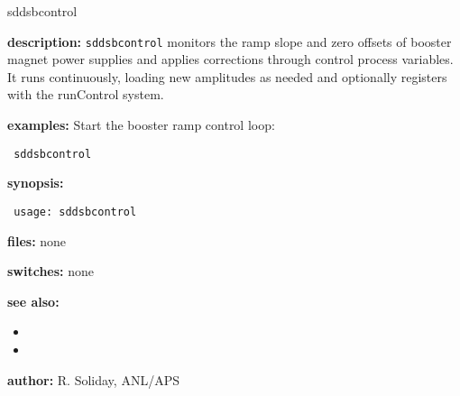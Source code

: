 %
\begin{sddsprog}{sddsbcontrol}
\item \textbf{description:}
\verb+sddsbcontrol+ monitors the ramp slope and zero offsets of booster magnet power supplies and applies corrections through control process variables. It runs continuously, loading new amplitudes as needed and optionally registers with the runControl system.

\item \textbf{examples:}
Start the booster ramp control loop:
\begin{flushleft}{\tt
sddsbcontrol\\
}\end{flushleft}

\item \textbf{synopsis:}
\begin{flushleft}{\tt
usage: sddsbcontrol\\
}\end{flushleft}

\item \textbf{files:} none

\item \textbf{switches:} none

\item \textbf{see also:}
  \begin{itemize}
  \item {}
  \item {}
  \end{itemize}

\item \textbf{author:} R. Soliday, ANL/APS
\end{sddsprog}
